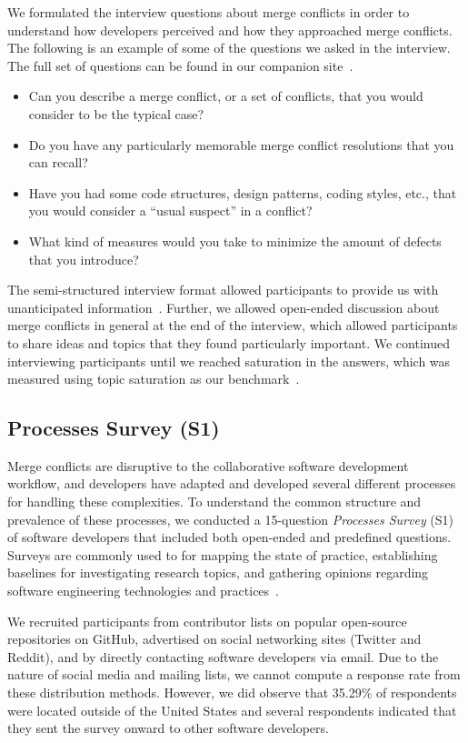 We formulated the interview questions about merge conflicts in order to understand how developers perceived and how they approached merge conflicts.
The following is an example of some of the questions we asked in the interview.
The full set of questions can be found in our companion site~\cite{companion_site}.
\begin{itemize}
	\item Can you describe a merge conflict, or a set of conflicts, that you would consider to be the typical case?
	\item Do you have any particularly memorable merge conflict resolutions that you can recall?
	\item Have you had some code structures, design patterns, coding styles, etc., that you would consider a ``usual suspect'' in a conflict?
	\item What kind of measures would you take to minimize the amount of defects that you introduce?
\end{itemize}

The semi-structured interview format allowed participants to provide us with unanticipated information~\cite{seaman2008qualitative}. 
Further, we allowed open-ended discussion about merge conflicts in general at the end of the interview, which allowed participants to share ideas and topics that they found particularly important. 
We continued interviewing participants until we reached saturation in the answers, which was measured using topic saturation as our benchmark~\cite{fusch2015we}.

\subsection{Processes Survey (S1)}\label{processes_survey}

Merge conflicts are disruptive to the collaborative software development workflow, and developers have adapted and developed several different processes for handling these complexities.
To understand the common structure and prevalence of these processes, we conducted a 15-question \textit{Processes Survey} (S1) of software developers that included both open-ended and predefined questions.
Surveys are commonly used to for mapping the state of practice, establishing baselines for investigating research topics, and gathering opinions regarding software engineering technologies and practices~\cite{deMello2016survey}.

We recruited participants from contributor lists on popular open-source repositories on GitHub, advertised on social networking sites (Twitter and Reddit), and by directly contacting software developers via email.
Due to the nature of social media and mailing lists, we cannot compute a response rate from these distribution methods.
However, we did observe that 35.29\% of respondents were located outside of the United States and several respondents indicated that they sent the survey onward to other software developers.


